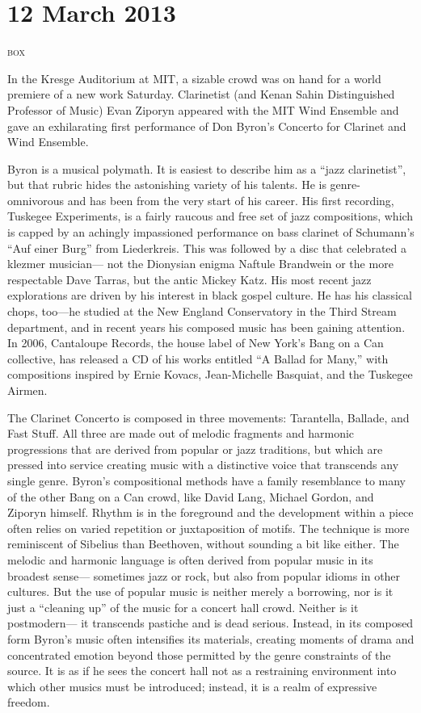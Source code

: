 \chapter{12 March 2013}

\textsc{box}

In the Kresge Auditorium at MIT, a sizable crowd was on hand for a world premiere of a new work Saturday. Clarinetist (and Kenan Sahin Distinguished Professor of Music) Evan Ziporyn appeared with the MIT Wind Ensemble and gave an exhilarating first performance of Don Byron’s Concerto for Clarinet and Wind Ensemble.

Byron is a musical polymath. It is easiest to describe him as a “jazz clarinetist”, but that rubric hides the astonishing variety of his talents. He is genre-omnivorous and has been from the very start of his career. His first recording, Tuskegee Experiments, is a fairly raucous and free set of jazz compositions, which is capped by an achingly impassioned performance on bass clarinet of Schumann’s “Auf einer Burg” from Liederkreis. This was followed by a disc that celebrated a klezmer musician— not the Dionysian enigma Naftule Brandwein or the more respectable Dave Tarras, but the antic Mickey Katz. His most recent jazz explorations are driven by his interest in black gospel culture. He has his classical chops, too—he studied at the New England Conservatory in the Third Stream department, and in recent years his composed music has been gaining attention. In 2006, Cantaloupe Records, the house label of New York’s Bang on a Can collective, has released a CD of his works entitled “A Ballad for Many,” with compositions inspired by Ernie Kovacs, Jean-Michelle Basquiat, and the Tuskegee Airmen.

The Clarinet Concerto is composed in three movements: Tarantella, Ballade, and Fast Stuff. All three are made out of melodic fragments and harmonic progressions that are derived from popular or jazz traditions, but which are pressed into service creating music with a distinctive voice that transcends any single genre. Byron’s compositional methods have a family resemblance to many of the other Bang on a Can crowd, like David Lang, Michael Gordon, and Ziporyn himself. Rhythm is in the foreground and the development within a piece often relies on varied repetition or juxtaposition of motifs. The technique is more reminiscent of Sibelius than Beethoven, without sounding a bit like either. The melodic and harmonic language is often derived from popular music in its broadest sense— sometimes jazz or rock, but also from popular idioms in other cultures. But the use of popular music is neither merely a borrowing, nor is it just a “cleaning up” of the music for a concert hall crowd. Neither is it postmodern— it transcends pastiche and is dead serious. Instead, in its composed form Byron’s music often intensifies its materials, creating moments of drama and concentrated emotion beyond those permitted by the genre constraints of the source. It is as if he sees the concert hall not as a restraining environment into which other musics must be introduced; instead, it is a realm of expressive freedom.

